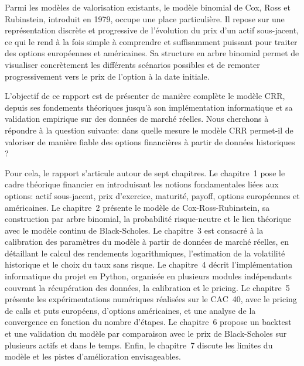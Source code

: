 \documentclass[11pt]{report}
\begin{document}
Parmi les modèles de valorisation existants, le modèle binomial de Cox, Ross et Rubinstein, introduit en 1979, occupe une place particulière. Il repose sur une représentation discrète et progressive de l'évolution du prix d'un actif sous-jacent, ce qui le rend à la fois simple à comprendre et suffisamment puissant pour traiter des options européennes et américaines. Sa structure en arbre binomial permet de visualiser concrètement les différents scénarios possibles et de remonter progressivement vers le prix de l'option à la date initiale.

L'objectif de ce rapport est de présenter de manière complète le modèle CRR, depuis ses fondements théoriques jusqu'à son implémentation informatique et sa validation empirique sur des données de marché réelles. Nous cherchons à répondre à la question suivante: dans quelle mesure le modèle CRR permet-il de valoriser de manière fiable des options financières à partir de données historiques ?

Pour cela, le rapport s'articule autour de sept chapitres. Le chapitre~1 pose le cadre théorique financier en introduisant les notions fondamentales liées aux options: actif sous-jacent, prix d'exercice, maturité, payoff, options européennes et américaines. Le chapitre~2 présente le modèle de Cox-Ross-Rubinstein, sa construction par arbre binomial, la probabilité risque-neutre et le lien théorique avec le modèle continu de Black-Scholes. Le chapitre~3 est consacré à la calibration des paramètres du modèle à partir de données de marché réelles, en détaillant le calcul des rendements logarithmiques, l'estimation de la volatilité historique et le choix du taux sans risque. Le chapitre~4 décrit l'implémentation informatique du projet en Python, organisée en plusieurs modules indépendants couvrant la récupération des données, la calibration et le pricing. Le chapitre~5 présente les expérimentations numériques réalisées sur le CAC~40, avec le pricing de calls et puts européens, d'options américaines, et une analyse de la convergence en fonction du nombre d'étapes. Le chapitre~6 propose un backtest et une validation du modèle par comparaison avec le prix de Black-Scholes sur plusieurs actifs et dans le temps. Enfin, le chapitre~7 discute les limites du modèle et les pistes d'amélioration envisageables.

\newpage

\end{document}
